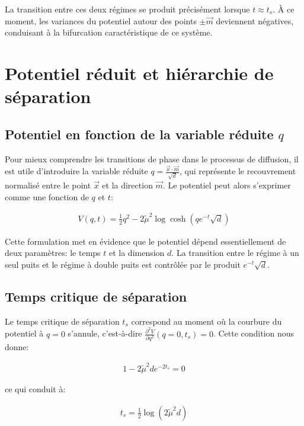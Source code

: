 \documentclass[11pt,a4paper]{article}
\begin{document}
La transition entre ces deux régimes se produit précisément lorsque $t \approx t_s$. À ce moment, les variances du potentiel autour des points $\pm \vec{m}$ deviennent négatives, conduisant à la bifurcation caractéristique de ce système.

\section{Potentiel réduit et hiérarchie de séparation}

\subsection{Potentiel en fonction de la variable réduite $q$}

Pour mieux comprendre les transitions de phase dans le processus de diffusion, il est utile d'introduire la variable réduite $q = \frac{\vec{x} \cdot \vec{m}}{\sqrt{d}}$, qui représente le recouvrement normalisé entre le point $\vec{x}$ et la direction $\vec{m}$. Le potentiel peut alors s'exprimer comme une fonction de $q$ et $t$:

\begin{align}
V(q, t) = \frac{1}{2}q^2 - 2\tilde{\mu}^2 \log \cosh\left(q e^{-t} \sqrt{d}\right)
\end{align}

Cette formulation met en évidence que le potentiel dépend essentiellement de deux paramètres: le temps $t$ et la dimension $d$. La transition entre le régime à un seul puits et le régime à double puits est contrôlée par le produit $e^{-t}\sqrt{d}$.

\subsection{Temps critique de séparation}

Le temps critique de séparation $t_s$ correspond au moment où la courbure du potentiel à $q=0$ s'annule, c'est-à-dire $\frac{\partial^2 V}{\partial q^2}(q=0, t_s) = 0$. Cette condition nous donne:

\begin{align}
1 - 2\tilde{\mu}^2 d e^{-2t_s} = 0
\end{align}

ce qui conduit à:

\begin{align}
t_s = \frac{1}{2}\log(2\tilde{\mu}^2 d)
\end{align}
\end{document}

